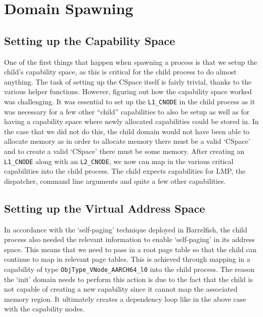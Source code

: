 \section{Domain Spawning}

\subsection{Setting up the Capability Space}
One of the first things that happen when spawning a process is that we setup the child's capability space, as this is critical for the child process to do almost anything. The task of setting up the CSpace itself is fairly trivial, thanks to the various helper functions. However, figuring out how the capability space worked was challenging. It was essential to set up the \texttt{L1_CNODE} in the child process as it was necessary for a few other ``child'' capabilities to also be setup as well as for having a capability space where newly allocated capabilities could be stored in. In the case that we did not do this, the child domain would not have been able to allocate memory as in order to allocate memory there must be a valid `CSpace' and to create a valid `CSpace' there must be some memory. After creating an \texttt{L1_CNODE} along with an \texttt{L2_CNODE}, we now can map in the various critical capabilities into the child process. The child expects capabilities for LMP, the dispatcher, command line arguments and quite a few other capabilities. 

\subsection{Setting up the Virtual Address Space}
In accordance with the `self-paging' technique deployed in Barrelfish, the child process also needed the relevant information to enable `self-paging' in its address space. This means that we need to pass in a root page table so that the child can continue to map in relevant page tables. This is achieved through mapping in a capability of type \texttt{ObjType_VNode_AARCH64_l0} into the child process. The reason the `init' domain needs to perform this action is due to the fact that the child is not capable of creating a new capability since it cannot map the associated memory region. It ultimately creates a dependency loop like in the above case with the capability nodes. 

